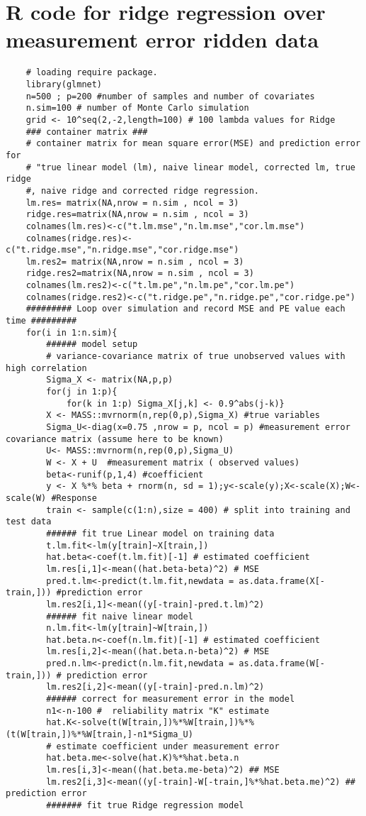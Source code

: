 \documentclass[12pt]{report}
\begin{document}
\section{R code for ridge regression over measurement error ridden data}
\label{a3}
\begin{lstlisting}
	# loading require package.
	library(glmnet)
	n=500 ; p=200 #number of samples and number of covariates
	n.sim=100 # number of Monte Carlo simulation
	grid <- 10^seq(2,-2,length=100) # 100 lambda values for Ridge
	### container matrix ###
	# container matrix for mean square error(MSE) and prediction error for 
	# "true linear model (lm), naive linear model, corrected lm, true ridge
	#, naive ridge and corrected ridge regression.
	lm.res= matrix(NA,nrow = n.sim , ncol = 3)
	ridge.res=matrix(NA,nrow = n.sim , ncol = 3)
	colnames(lm.res)<-c("t.lm.mse","n.lm.mse","cor.lm.mse")
	colnames(ridge.res)<-c("t.ridge.mse","n.ridge.mse","cor.ridge.mse")
	lm.res2= matrix(NA,nrow = n.sim , ncol = 3)
	ridge.res2=matrix(NA,nrow = n.sim , ncol = 3)
	colnames(lm.res2)<-c("t.lm.pe","n.lm.pe","cor.lm.pe")
	colnames(ridge.res2)<-c("t.ridge.pe","n.ridge.pe","cor.ridge.pe")
	######### Loop over simulation and record MSE and PE value each time #########
	for(i in 1:n.sim){
		###### model setup
		# variance-covariance matrix of true unobserved values with high correlation
		Sigma_X <- matrix(NA,p,p) 
		for(j in 1:p){
			for(k in 1:p) Sigma_X[j,k] <- 0.9^abs(j-k)}
		X <- MASS::mvrnorm(n,rep(0,p),Sigma_X) #true variables
		Sigma_U<-diag(x=0.75 ,nrow = p, ncol = p) #measurement error covariance matrix (assume here to be known)
		U<- MASS::mvrnorm(n,rep(0,p),Sigma_U)
		W <- X + U  #measurement matrix ( observed values)
		beta<-runif(p,1,4) #coefficient
		y <- X %*% beta + rnorm(n, sd = 1);y<-scale(y);X<-scale(X);W<-scale(W) #Response 
		train <- sample(c(1:n),size = 400) # split into training and test data
		###### fit true Linear model on training data
		t.lm.fit<-lm(y[train]~X[train,])
		hat.beta<-coef(t.lm.fit)[-1] # estimated coefficient
		lm.res[i,1]<-mean((hat.beta-beta)^2) # MSE 
		pred.t.lm<-predict(t.lm.fit,newdata = as.data.frame(X[-train,])) #prediction error
		lm.res2[i,1]<-mean((y[-train]-pred.t.lm)^2)
		###### fit naive linear model
		n.lm.fit<-lm(y[train]~W[train,])
		hat.beta.n<-coef(n.lm.fit)[-1] # estimated coefficient
		lm.res[i,2]<-mean((hat.beta.n-beta)^2) # MSE 
		pred.n.lm<-predict(n.lm.fit,newdata = as.data.frame(W[-train,])) # prediction error
		lm.res2[i,2]<-mean((y[-train]-pred.n.lm)^2)
		###### correct for measurement error in the model
		n1<-n-100 #  reliability matrix "K" estimate
		hat.K<-solve(t(W[train,])%*%W[train,])%*%(t(W[train,])%*%W[train,]-n1*Sigma_U)
		# estimate coefficient under measurement error
		hat.beta.me<-solve(hat.K)%*%hat.beta.n
		lm.res[i,3]<-mean((hat.beta.me-beta)^2) ## MSE
		lm.res2[i,3]<-mean((y[-train]-W[-train,]%*%hat.beta.me)^2) ## prediction error 
		####### fit true Ridge regression model
		

\end{lstlisting}
\end{document}
